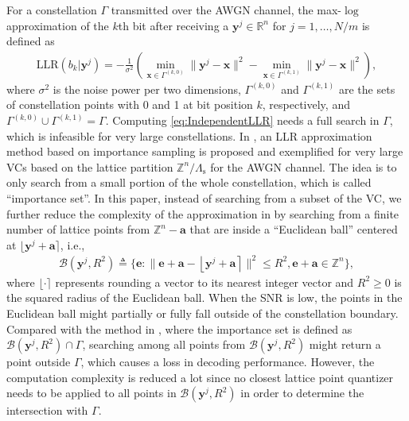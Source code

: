 \documentclass[journal]{IEEEtran}
\newcommand{\R}{\mathbb{R}}
\newcommand{\Z}{\mathbb{Z}}
\newcommand{\B}{\mathcal{B}}
\newcommand{\ba}{\boldsymbol{a}}
\newcommand{\be}{\boldsymbol{e}}
\newcommand{\bx}{\boldsymbol{x}}
\newcommand{\by}{\boldsymbol{y}}
\newcommand{\Lambdas}{\Lambda_\mathrm{s}}
\begin{document}
For a constellation $\Gamma$ transmitted over the AWGN channel, the max-$\log$ approximation \cite{viterbi98} of the $k$th bit after receiving a $\by^j\in\R^n$ for $j=1,\ldots,N/m$ is defined as
\begin{align}
    \text{LLR}(b_{k}|\by^j)=  -\frac{1}{\sigma^2}\left (\min_{\bx\in\Gamma^{(k,0)}}\|\by^j-\bx\|^2- \min_{\bx\in\Gamma^{(k,1)}}\|\by^j-\bx\|^2\right),\label{eq:IndependentLLR}
\end{align}
where $\sigma^2$ is the noise power per two dimensions, $\Gamma^{(k,0)}$ and $\Gamma^{(k,1)}$ are the sets of constellation points 
with 0 and 1 at bit position $k$, respectively, and $\Gamma^{(k,0)}\cup \Gamma^{(k,1)}=\Gamma$. Computing \eqref{eq:IndependentLLR} needs a full search in $\Gamma$, which is infeasible for very large constellations. In \cite{ourTC}, an LLR approximation method based on importance sampling is proposed and exemplified for very large VCs based on the lattice partition $\Z^n/\Lambdas$ for the AWGN channel. The idea is to only search from a small portion of the whole constellation, which is called ``importance set''. In this paper, instead of searching from a subset of the VC, we further reduce the complexity of the approximation in \cite[Eq. (33)]{ourTC} by searching from a finite number of lattice points from $\Z^n-\ba$ that are inside a ``Euclidean ball'' centered at $\lfloor\by^j+\ba\rceil$, i.e.,
\begin{align}\label{eq:ball}
    \B(\by^j,R^2)\triangleq\{\be:\|\be+\ba-\left \lfloor \by^j+\ba  \right \rceil\|^2 \leq R^2, \be+\ba \in \Z^n\},
\end{align}
where $\lfloor\cdot\rceil$ represents rounding a vector to its nearest integer vector and $R^2\ge 0$ is the squared radius of the Euclidean ball. When the SNR is low, the points in the Euclidean ball might partially or fully fall outside of the constellation boundary. Compared with the method in \cite[Eq. (33)]{ourTC}, where the importance set is defined as $\B(\by^j,R^2)\cap \Gamma$, searching among all points from $\B(\by^j,R^2)$ might return a point outside $\Gamma$, which causes a loss in decoding performance. However, the computation complexity is reduced a lot since no closest lattice point quantizer needs to be applied to all points in $\B(\by^j,R^2)$ in order to determine the intersection with $\Gamma$.
\end{document}

